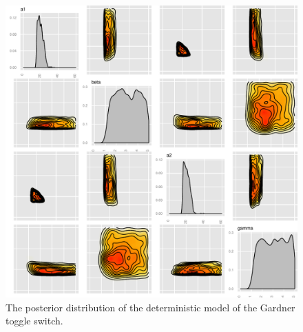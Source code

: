 \begin{figure}[p]
\centering
\includegraphics[scale=0.5]{chapterModelling/images/Gardner/wide_var/posterior_deter_high_mean.pdf}
\caption{The posterior distribution of the deterministic model of the Gardner toggle switch.}
\label{fig:Gard_post_det_high}
\end{figure}

